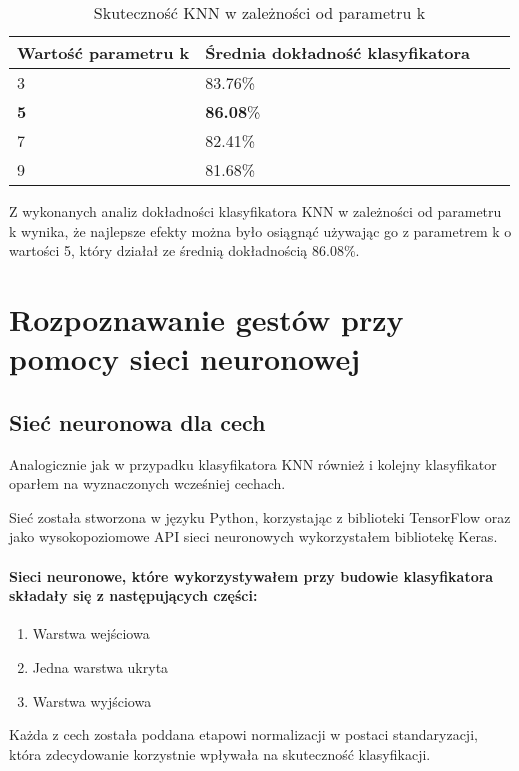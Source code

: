 \documentclass[a4paper,12pt,twoside,openany]{report}
\begin{document}
\begin{table}[H]
	\centering
	\begin{tabularx}{\textwidth}{|X|X|X|X|}
		\hline
		\textbf{Wartość parametru k} & \textbf{Średnia dokładność klasyfikatora}    \\ 
		
		\hline
		3 & 83.76\% \\ 
		\hline
		\textbf{5} & \textbf{86.08}\% \\
		\hline
		7 & 82.41\% \\
		\hline
		9 & 81.68\% \\
		\hline
	\end{tabularx}
	
	\caption{Skuteczność KNN w zależności od parametru k}
\end{table}
	
Z wykonanych analiz dokładności klasyfikatora KNN w zależności od parametru k wynika, że najlepsze efekty można było osiągnąć używając go z parametrem k o wartości 5, który działał ze średnią dokładnością 86.08\%.
\section{Rozpoznawanie gestów przy pomocy sieci neuronowej}
\subsection{Sieć neuronowa dla cech}
	Analogicznie jak w przypadku klasyfikatora KNN również i  kolejny klasyfikator oparłem na wyznaczonych wcześniej cechach.
	
	Sieć została stworzona w języku Python, korzystając z biblioteki TensorFlow oraz jako wysokopoziomowe API sieci neuronowych wykorzystałem bibliotekę Keras.
	
	\paragraph{Sieci neuronowe, które wykorzystywałem przy budowie klasyfikatora składały się z następujących części:}
	\begin{enumerate}
		\item Warstwa wejściowa
		\item Jedna warstwa ukryta
		\item Warstwa wyjściowa
	\end{enumerate}

	\noindent
	Każda z cech została poddana etapowi normalizacji w postaci standaryzacji, która zdecydowanie korzystnie wpływała na skuteczność klasyfikacji.
	
\end{document}
